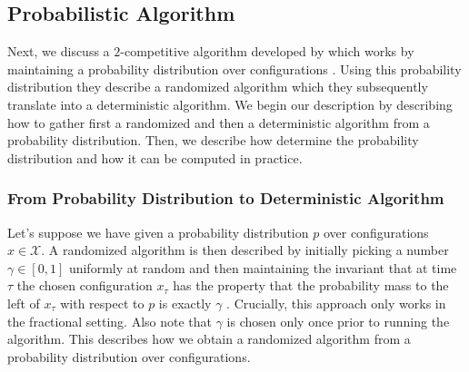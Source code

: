 \subsection{Probabilistic Algorithm}\label{section:online_algorithms:ud:probabilistic}

Next, we discuss a $2$-competitive algorithm developed by \citeauthor*{Bansal2015} which works by maintaining a probability distribution over configurations \cite{Bansal2015}. Using this probability distribution they describe a randomized algorithm which they subsequently translate into a deterministic algorithm. We begin our description by describing how to gather first a randomized and then a deterministic algorithm from a probability distribution. Then, we describe how \citeauthor*{Bansal2015} determine the probability distribution and how it can be computed in practice.

\subsubsection{From Probability Distribution to Deterministic Algorithm}

Let's suppose we have given a probability distribution $p$ over configurations $x \in \mathcal{X}$. A randomized algorithm is then described by initially picking a number $\gamma \in [0,1]$ uniformly at random and then maintaining the invariant that at time $\tau$ the chosen configuration $x_{\tau}$ has the property that the probability mass to the left of $x_{\tau}$ with respect to $p$ is exactly $\gamma$ \cite{Bansal2015}. Crucially, this approach only works in the fractional setting. Also note that $\gamma$ is chosen only once prior to running the algorithm. This describes how we obtain a randomized algorithm from a probability distribution over configurations.

